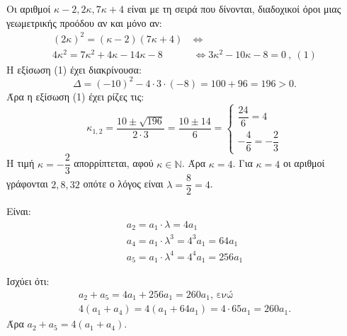
\begin{alist}
\item Οι αριθμοί $\kappa - 2, 2\kappa, 7\kappa + 4$ είναι με τη σειρά που δίνονται, διαδοχικοί όροι μιας γεωμετρικής προόδου αν και μόνο αν:
\begin{align*}
(2\kappa)^2 = (\kappa - 2)(7\kappa + 4) \ &\Leftrightarrow \\
4\kappa^2 = 7\kappa^2 + 4\kappa - 14\kappa - 8 \ &\Leftrightarrow 3\kappa^2 - 10\kappa - 8 = 0\ ,\ (1)
\end{align*}
Η εξίσωση (1) έχει διακρίνουσα:
\[\Delta = (-10)^2 - 4 \cdot 3 \cdot (-8) = 100 + 96 = 196 > 0.\]
Άρα η εξίσωση (1) έχει ρίζες τις:
\[\kappa_{1,2} = \dfrac{10 \pm \sqrt{196}}{2 \cdot 3} = \dfrac{10 \pm 14}{6} = \begin{cases} \dfrac{24}{6} = 4 \\ -\dfrac{4}{6} = -\dfrac{2}{3} \end{cases}\]
Η τιμή $\kappa = -\dfrac{2}{3}$ απορρίπτεται, αφού $\kappa \in \mathbb{N}$. Άρα $\kappa = 4$. Για $\kappa = 4$ οι αριθμοί γράφονται $2, 8, 32$ οπότε ο λόγος είναι $\lambda = \dfrac{8}{2} = 4$.
\item
\begin{rlist}
\item Είναι:
\begin{gather*}
a_2 = a_1 \cdot \lambda = 4a_1 \\
a_4 = a_1 \cdot \lambda^3 = 4^3 a_1 = 64a_1 \\
a_5 = a_1 \cdot \lambda^4 = 4^4 a_1 = 256a_1
\end{gather*}

\item Ισχύει ότι:
\begin{gather*}
a_2 + a_5 = 4a_1 + 256a_1 = 260a_1\text{, ενώ} \\
4(a_1 + a_4) = 4(a_1 + 64a_1) = 4 \cdot 65a_1 = 260a_1.
\end{gather*}
Άρα $a_2 + a_5 = 4(a_1 + a_4)$.
\end{rlist}
\end{alist}

